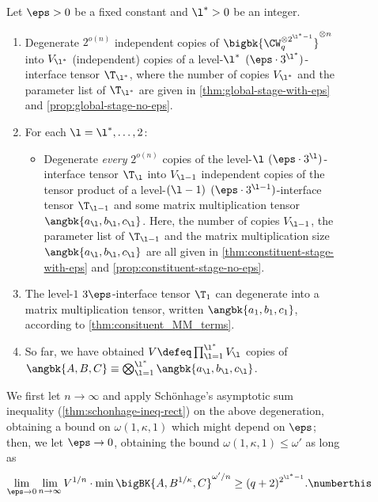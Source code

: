 \begin{figure}[ht]
  \centering
  \begin{tcolorbox}
    Let $\eps > 0$ be a fixed constant and $\l^* > 0$ be an integer.
    \begin{enumerate}
    \item Degenerate $2^{o(n)}$ independent copies of $\bigbk{\CW_q^{\otimes 2^{\l^* - 1}}}^{\otimes n}$ into $\numgrowl[\l^*]$ (independent) copies of a level-$\l^*$ $(\eps \cdot 3^{\l^*})$-interface tensor $\interl[\l^*]$, where the number of copies $\numgrowl[\l^*]$ and the parameter list of $\interl[\l^*]$ are given in \cref{thm:global-stage-with-eps} and \cref{prop:global-stage-no-eps}.
    \item For each $\l = \l^*, \ldots, 2$:
      \begin{itemize}
      \item Degenerate \emph{every} $2^{o(n)}$ copies of the level-$\l$ $(\eps \cdot 3^{\l})$-interface tensor $\interl[\l]$ into $\numgrowl[\l - 1]$ independent copies of the tensor product of a level-$(\l - 1)$ $(\eps \cdot 3^{\l - 1})$-interface tensor $\interl[\l - 1]$ and some matrix multiplication tensor $\angbk{a_\l, b_\l, c_\l}$. Here, the number of copies $\numgrowl[\l - 1]$, the parameter list of $\interl[\l - 1]$ and the matrix multiplication size $\angbk{a_\l, b_\l, c_\l}$ are all given in \cref{thm:constituent-stage-with-eps} and \cref{prop:constituent-stage-no-eps}.
      \end{itemize}
    \item The level-$1$ $3\eps$-interface tensor $\interl[1]$ can degenerate into a matrix multiplication tensor, written $\angbk{a_1, b_1, c_1}$, according to \cref{thm:consituent_MM_terms}.
    \item So far, we have obtained $\numgrow \defeq \prod_{\l = 1}^{\l^*} \numgrowl[\l]$ copies of $\angbk{A, B, C} \equiv \bigotimes_{\l = 1}^{\l^*} \angbk{a_\l, b_\l, c_\l}$.
    \end{enumerate}
    We first let $n \to \infty$ and apply Sch{\"o}nhage's asymptotic sum inequality 
    (\cref{thm:schonhage-ineq-rect}) on the above degeneration, obtaining a bound on $\omega(1, \kappa, 1)$ which might depend on $\eps$; then, we let $\eps \to 0$, obtaining the bound $\omega(1, \kappa, 1) \le \omega'$ as long as
    \[
      \lim_{\eps \to 0} \lim_{n \to \infty} \numgrow^{1/n} \cdot \min\bigBK{A, B^{1/\kappa}, C}^{\omega'/n} \ge (q + 2)^{2^{\l^* - 1}}.
      \numberthis \label{eq:asymptotic_sum_inequality_in_algorithm}
    \]
  \end{tcolorbox}
  \vspace{-1.5em}
\end{figure}

